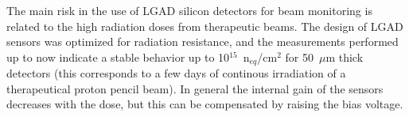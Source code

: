 \noindent The main risk in
the use of LGAD silicon detectors for beam monitoring is related to the high radiation doses from
therapeutic beams. The design of LGAD sensors was optimized for radiation
resistance, and the measurements performed up to now indicate a stable behavior up to 10$^{15}$~n$_{eq}$/cm$^2$ for 50~$\mu$m thick detectors
(this corresponds to a few days of continous irradiation of a therapeutical proton pencil beam).
In general the internal gain of the sensors decreases with the dose, but this can be compensated by raising the bias voltage.


